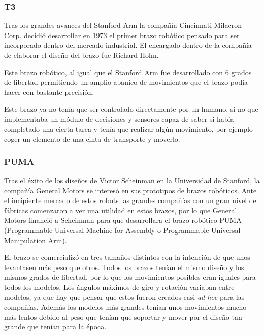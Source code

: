 \subsubsection{T3}

Tras los grandes avances del Stanford Arm la compañía Cincinnati Milacron Corp. decidió desarrollar en 1973 el primer brazo robótico pensado para ser incorporado dentro del mercado industrial. El encargado dentro de la compañía de elaborar el diseño del brazo fue Richard Hohn.

\vspace{10px}

Este brazo robótico, al igual que el Stanford Arm fue desarrollado con 6 grados de libertad permitiendo un amplio abanico de movimientos que el brazo podía hacer con bastante precisión.

\vspace{10px}

Este brazo ya no tenía que ser controlado directamente por un humano, si no que implementaba un módulo de decisiones y sensores capaz de saber si había completado una cierta tarea y tenía que realizar algún movimiento, por ejemplo coger un elemento de una cinta de transporte y moverlo.

\subsubsection{PUMA}

Tras el éxito de los diseños de Victor Scheinman en la Universidad de Stanford, la compañía General Motors se interesó en sus prototipos de brazos robóticos. Ante el incipiente mercado de estos robots las grandes compañías con un gran nivel de fábricas comenzaron a ver una utilidad en estos brazos, por lo que General Motors financió a Scheinman para que desarrollara el brazo robótico PUMA (Programmable Universal Machine for Assembly o Programmable Universal Manipulation Arm).

El brazo se comercializó en tres tamaños distintos con la intención de que unos levantasen más peso que otros. Todos los brazos tenían el mismo diseño y los mismos grados de libertad, por lo que los movimientos posibles eran iguales para todos los modelos. Los ángulos máximos de giro y rotación variaban entre modelos, ya que hay que pensar que estos fueron creados casi \textit{ad hoc} para las compañías. Además los modelos más grandes tenían unos movimientos mucho más lentos debido al peso que tenían que soportar y mover por el diseño tan grande que tenían para la época.

